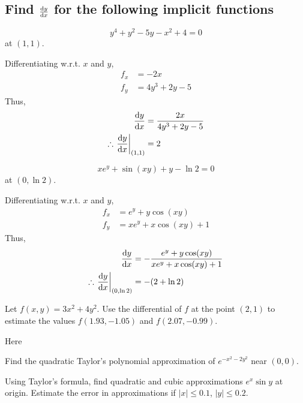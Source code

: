 \subsection{Find $\dv{y}{x}$ for the following implicit functions}
\begin{asign}
	\[y^4+y^2-5y-x^2+4=0\] at $(1,1)$.
\end{asign}
\begin{anse}
	Differentiating w.r.t. $x$ and $y$,
	\[\begin{split}
		f_x&=-2x\\
		f_y&=4y^3+2y-5
	\end{split}\]
	Thus,
	\[\begin{split}
		\dv{y}{x}&=\frac{2x}{4y^3+2y-5}\\
		\therefore \eval{\dv{y}{x}}_{(1,1)}&=2
	\end{split}\]
\end{anse}
\begin{asign}
	\[xe^y+\sin(xy)+y-\ln 2=0\]
	at $(0,\ln 2)$.
\end{asign}
\begin{anse}
	Differentiating w.r.t. $x$ and $y$,
	\[\begin{split}
		f_x&=e^y+y\cos(xy)\\
		f_y&=xe^y+x\cos(xy)+1
	\end{split}\]
	Thus,
	\[\begin{split}
		\dv{y}{x}&=-\frac{e^y+y\cos(xy)}{xe^y+x\cos(xy)+1}\\
		\therefore \eval{\dv{y}{x}}_{(0,\ln2)}&=-(2+\ln2)
	\end{split}\]
\end{anse}
\begin{asign}
	Let $f(x,y)=3x^2+4y^2$. Use the differential of $f$ at the point $(2,1)$ to estimate the values $f(1.93,-1.05)$ and $f(2.07,-0.99)$.
\end{asign}
\begin{anse}
	Here
\end{anse}
\begin{asign}
	Find the quadratic Taylor's polynomial approximation of $e^{-x^2-2y^2}$ near $(0,0)$.
\end{asign}
\begin{anse}
	
\end{anse}
\begin{asign}
	Using Taylor’s formula, find quadratic and cubic approximations $e^x\sin y$ at origin. Estimate the error in approximations if $|x|\leq0.1$, $|y|\leq0.2$.
\end{asign}
\begin{anse}
	
\end{anse}














